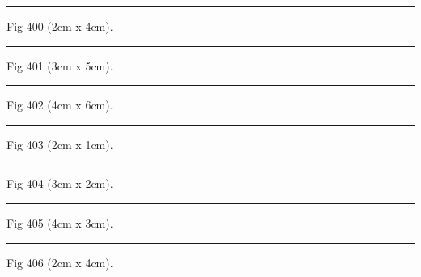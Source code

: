 \documentclass[a4paper,11pt]{article}
\begin{document}
\begin{swarmwrap}%
  \begin{minipage}[t]{2cm}
    \centering
    \rule{\linewidth}{4cm}
    {\footnotesize Fig 400 (2cm x 4cm).}
  \end{minipage}%
\end{swarmwrap}%
\swarmwrapnext
\lipsum[100]%

\begin{swarmwrap}%
  \begin{minipage}[t]{3cm}
    \centering
    \rule{\linewidth}{5cm}
    {\footnotesize Fig 401 (3cm x 5cm).}
  \end{minipage}%
\end{swarmwrap}%
\swarmwrapnext
\lipsum[101]%

\begin{swarmwrap}%
  \begin{minipage}[t]{4cm}
    \centering
    \rule{\linewidth}{6cm}
    {\footnotesize Fig 402 (4cm x 6cm).}
  \end{minipage}%
\end{swarmwrap}%
\swarmwrapnext
\lipsum[102]%

\begin{swarmwrap}%
  \begin{minipage}[t]{2cm}
    \centering
    \rule{\linewidth}{1cm}
    {\footnotesize Fig 403 (2cm x 1cm).}
  \end{minipage}%
\end{swarmwrap}%
\swarmwrapnext
\lipsum[103]%

\begin{swarmwrap}%
  \begin{minipage}[t]{3cm}
    \centering
    \rule{\linewidth}{2cm}
    {\footnotesize Fig 404 (3cm x 2cm).}
  \end{minipage}%
\end{swarmwrap}%
\swarmwrapnext
\lipsum[104]%

\begin{swarmwrap}%
  \begin{minipage}[t]{4cm}
    \centering
    \rule{\linewidth}{3cm}
    {\footnotesize Fig 405 (4cm x 3cm).}
  \end{minipage}%
\end{swarmwrap}%
\swarmwrapnext
\lipsum[105]%

\begin{swarmwrap}%
  \begin{minipage}[t]{2cm}
    \centering
    \rule{\linewidth}{4cm}
    {\footnotesize Fig 406 (2cm x 4cm).}
  \end{minipage}%
\end{swarmwrap}%
\swarmwrapnext
\lipsum[106]%
\end{document}

